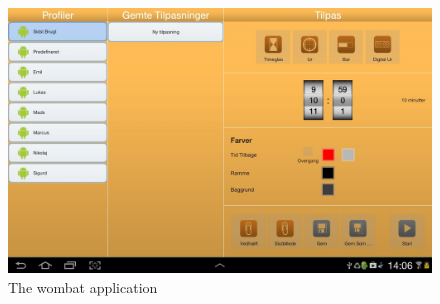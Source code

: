 \begin{figure}[H]
\centering
\includegraphics[angle=90,width=0.7215\linewidth]{img/screenshots/wombat.jpg}
\caption{The wombat application}
\label{fig:wombat}
\end{figure}
